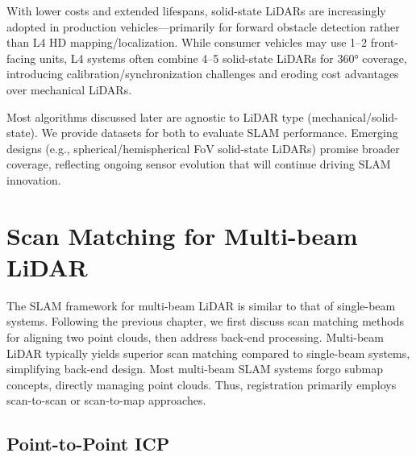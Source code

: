With lower costs and extended lifespans, solid-state LiDARs are increasingly adopted in production vehicles—primarily for forward obstacle detection rather than L4 HD mapping/localization. While consumer vehicles may use 1–2 front-facing units, L4 systems often combine 4–5 solid-state LiDARs for 360° coverage, introducing calibration/synchronization challenges and eroding cost advantages over mechanical LiDARs.  

Most algorithms discussed later are agnostic to LiDAR type (mechanical/solid-state). We provide datasets for both to evaluate SLAM performance. Emerging designs (e.g., spherical/hemispherical FoV solid-state LiDARs) promise broader coverage, reflecting ongoing sensor evolution that will continue driving SLAM innovation.

\section{Scan Matching for Multi-beam LiDAR}  
The SLAM framework for multi-beam LiDAR is similar to that of single-beam systems. Following the previous chapter, we first discuss scan matching methods for aligning two point clouds, then address back-end processing. Multi-beam LiDAR typically yields superior scan matching compared to single-beam systems, simplifying back-end design. Most multi-beam SLAM systems forgo submap concepts, directly managing point clouds. Thus, registration primarily employs scan-to-scan or scan-to-map approaches.  

\subsection{Point-to-Point ICP}  
